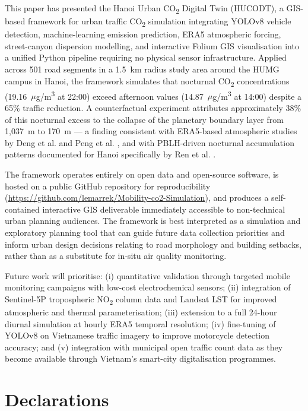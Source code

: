 \documentclass[12pt,a4paper]{article}
\begin{document}
This paper has presented the Hanoi Urban CO\textsubscript{2} Digital Twin (HUCODT), a GIS-based framework for urban traffic CO\textsubscript{2} simulation integrating YOLOv8 vehicle detection, machine-learning emission prediction, ERA5 atmospheric forcing, street-canyon dispersion modelling, and interactive Folium GIS visualisation into a unified Python pipeline requiring no physical sensor infrastructure. Applied across 501 road segments in a 1.5~km radius study area around the HUMG campus in Hanoi, the framework simulates that nocturnal CO\textsubscript{2} concentrations (19.16~$\mu$g/m\textsuperscript{3} at 22:00) exceed afternoon values (14.87~$\mu$g/m\textsuperscript{3} at 14:00) despite a 65\% traffic reduction. A counterfactual experiment attributes approximately 38\% of this nocturnal excess to the collapse of the planetary boundary layer from 1,037~m to 170~m --- a finding consistent with ERA5-based atmospheric studies by Deng et al. \cite{Deng2023} and Peng et al. \cite{Peng2023}, and with PBLH-driven nocturnal accumulation patterns documented for Hanoi specifically by Ren et al. \cite{Ren2021}.

The framework operates entirely on open data and open-source software, is hosted on a public GitHub repository for reproducibility (\url{https://github.com/lemarrek/Mobility-co2-Simulation}), and produces a self-contained interactive GIS deliverable immediately accessible to non-technical urban planning audiences. The framework is best interpreted as a simulation and exploratory planning tool that can guide future data collection priorities and inform urban design decisions relating to road morphology and building setbacks, rather than as a substitute for in-situ air quality monitoring.

Future work will prioritise: (i) quantitative validation through targeted mobile monitoring campaigns with low-cost electrochemical sensors; (ii) integration of Sentinel-5P tropospheric NO\textsubscript{2} column data and Landsat LST for improved atmospheric and thermal parameterisation; (iii) extension to a full 24-hour diurnal simulation at hourly ERA5 temporal resolution; (iv) fine-tuning of YOLOv8 on Vietnamese traffic imagery to improve motorcycle detection accuracy; and (v) integration with municipal open traffic count data as they become available through Vietnam's smart-city digitalisation programmes.

\section*{Declarations}
\end{document}
